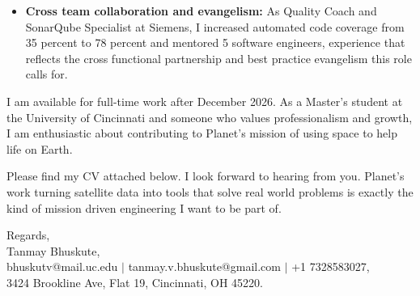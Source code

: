 \documentclass[11pt]{letter}
\begin{document}
\begin{letter}{}
\begin{itemize}[leftmargin=*, itemsep=0.45em]
    \item \textbf{Cross team collaboration and evangelism:} As Quality Coach and SonarQube Specialist at Siemens, I increased automated code coverage from 35 percent to 78 percent and mentored 5 software engineers, experience that reflects the cross functional partnership and best practice evangelism this role calls for.
\end{itemize}

I am available for full-time work after December 2026. As a Master's student at the University of Cincinnati and someone who values professionalism and growth, I am enthusiastic about contributing to Planet's mission of using space to help life on Earth.

Please find my CV attached below. I look forward to hearing from you. Planet's work turning satellite data into tools that solve real world problems is exactly the kind of mission driven engineering I want to be part of.

{\setlength{\parskip}{0pt}
Regards,\\
Tanmay Bhuskute,\\
bhuskutv@mail.uc.edu $\mid$ tanmay.v.bhuskute@gmail.com $\mid$ +1 7328583027,\\
3424 Brookline Ave, Flat 19, Cincinnati, OH 45220.
}

\end{letter}
\end{document}
